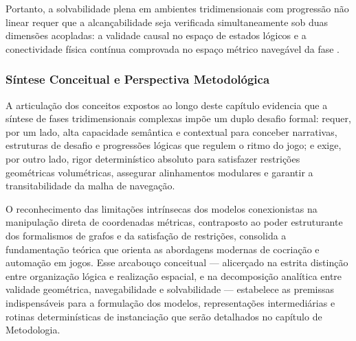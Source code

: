Portanto, a solvabilidade plena em ambientes tridimensionais com progressão não linear requer que a alcançabilidade seja verificada simultaneamente sob duas dimensões acopladas: a validade causal no espaço de estados lógicos e a conectividade física contínua comprovada no espaço métrico navegável da fase \cite{dormans2010, linden2014dungeons, xu2025constraint, xu2025databasedrivenframework3dlevel}.

\subsubsection{Síntese Conceitual e Perspectiva Metodológica}
\label{sec:sintese_transicao}

A articulação dos conceitos expostos ao longo deste capítulo evidencia que a síntese de fases tridimensionais complexas impõe um duplo desafio formal: requer, por um lado, alta capacidade semântica e contextual para conceber narrativas, estruturas de desafio e progressões lógicas que regulem o ritmo do jogo; e exige, por outro lado, rigor determinístico absoluto para satisfazer restrições geométricas volumétricas, assegurar alinhamentos modulares e garantir a transitabilidade da malha de navegação.

O reconhecimento das limitações intrínsecas dos modelos conexionistas na manipulação direta de coordenadas métricas, contraposto ao poder estruturante dos formalismos de grafos e da satisfação de restrições, consolida a fundamentação teórica que orienta as abordagens modernas de cocriação e automação em jogos. Esse arcabouço conceitual --- alicerçado na estrita distinção entre organização lógica e realização espacial, e na decomposição analítica entre validade geométrica, navegabilidade e solvabilidade --- estabelece as premissas indispensáveis para a formulação dos modelos, representações intermediárias e rotinas determinísticas de instanciação que serão detalhados no capítulo de Metodologia.
